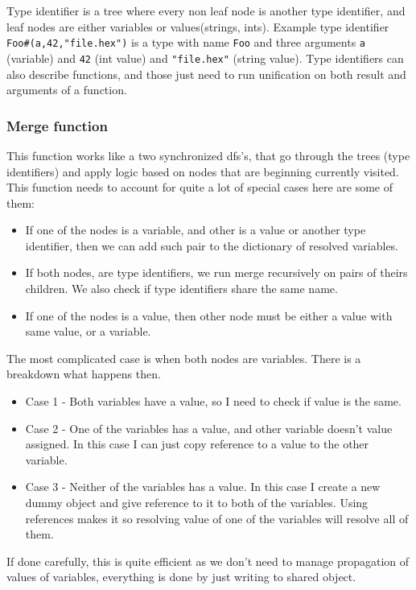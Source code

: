 \documentclass[14pt]{report}
\begin{document}
Type identifier is a tree where every non leaf node is another type identifier, and leaf nodes are either variables or values(strings, ints). Example type identifier \verb!Foo#(a,42,"file.hex")! is a type with name \verb!Foo! and three arguments \verb!a! (variable) and \verb!42! (int value) and \verb!"file.hex"! (string value). Type identifiers can also describe functions, and those just need to run unification on both result and arguments of a function.

\subsubsection*{Merge function}
This function works like a two synchronized dfs's, that go through the trees (type identifiers) and apply logic based on nodes that are beginning currently visited.
This function needs to account for quite a lot of special cases here are some of them:
\begin{itemize}
    \item If one of the nodes is a variable, and other is a value or another type identifier, then we can add such pair to the dictionary of resolved variables.
    \item If both nodes, are type identifiers, we run merge recursively on pairs of theirs children. We also check if type identifiers share the same name.
    \item If one of the nodes is a value, then other node must be either a value with same value, or a variable.
\end{itemize}
The most complicated case is when both nodes are variables. There is a breakdown what happens then. 
\begin{itemize}
    \item Case 1 - Both variables have a value, so I need to check if value is the same.
    \item Case 2 - One of the variables has a value, and other variable doesn't value assigned. In this case I can just copy reference to a value to the other variable.
    \item Case 3 - Neither of the variables has a value. In this case I create a new dummy object and give reference to it to both of the variables. Using references makes it so resolving value of one of the variables will resolve all of them. 
\end{itemize}
If done carefully, this is quite efficient as we don't need to manage propagation of values of variables, everything is done by just writing to shared object.
\end{document}
